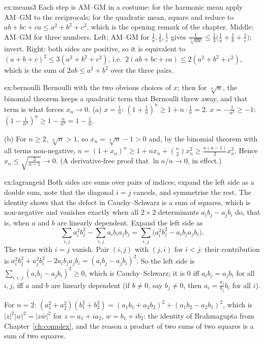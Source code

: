 \begin{solution}{ex:means3}
\idea Each step is AM--GM in a costume: for the harmonic mean apply AM--GM to the reciprocals; for the quadratic mean, square and reduce to $ab+bc+ca\le a^2+b^2+c^2$, which is the opening remark of the chapter.
\writeup Middle: AM--GM for three numbers. Left: AM--GM for $\frac1a,\frac1b,\frac1c$ gives $\frac1{\sqrt[3]{abc}}\le\frac13\bigl(\frac1a+\frac1b+\frac1c\bigr)$; invert. Right: both sides are positive, so it is equivalent to $(a+b+c)^2\le3(a^2+b^2+c^2)$, i.e.\ $2(ab+bc+ca)\le2(a^2+b^2+c^2)$, which is the sum of $2ab\le a^2+b^2$ over the three pairs.
\end{solution}

\begin{solution}{ex:bernoulli}
\idea Bernoulli with the two obvious choices of $x$; then for $\sqrt[n]n$, the binomial theorem keeps a quadratic term that Bernoulli threw away, and that term is what forces $x_n\to0$.
\writeup (a) $x=\frac1n$: $(1+\frac1n)^n\ge1+n\cdot\frac1n=2$. $x=-\frac1{n^2}\ge-1$: $(1-\frac1{n^2})^n\ge1-\frac n{n^2}=1-\frac1n$.

(b) For $n\ge2$, $\sqrt[n]n>1$, so $x_n=\sqrt[n]n-1>0$ and, by the binomial theorem with all terms non-negative, $n=(1+x_n)^n\ge1+nx_n+\binom n2x_n^2\ge\frac{n(n-1)}2x_n^2$. Hence $x_n\le\sqrt{\frac2{n-1}}\to0$. (A derivative-free proof that $\ln n/n\to0$, in effect.)
\end{solution}

\begin{solution}{ex:lagrangeid}
\idea Both sides are sums over pairs of indices; expand the left side as a double sum, note that the diagonal $i=j$ cancels, and symmetrise the rest. The identity shows that the defect in Cauchy--Schwarz is a sum of squares, which is non-negative and vanishes exactly when all $2\times2$ determinants $a_ib_j-a_jb_i$ do, that is, when $a$ and $b$ are linearly dependent.
\writeup Expand the left side as
\[
\sum_{i,j}a_i^2b_j^2-\sum_{i,j}a_ib_ia_jb_j
=\sum_{i,j}\bigl(a_i^2b_j^2-a_ib_ja_jb_i\bigr).
\] The terms with $i=j$ vanish. Pair $(i,j)$ with $(j,i)$ for $i<j$: their contribution is $a_i^2b_j^2+a_j^2b_i^2-2a_ib_ja_jb_i=(a_ib_j-a_jb_i)^2$. So the left side is $\sum_{i<j}(a_ib_j-a_jb_i)^2\ge0$, which is Cauchy--Schwarz; it is $0$ iff $a_ib_j=a_jb_i$ for all $i,j$, iff $a$ and $b$ are linearly dependent (if $b\ne0$, say $b_j\ne0$, then $a_i=\frac{a_j}{b_j}b_i$ for all $i$).

For $n=2$: $(a_1^2+a_2^2)(b_1^2+b_2^2)=(a_1b_1+a_2b_2)^2+(a_1b_2-a_2b_1)^2$, which is $|z|^2|w|^2=|z\bar w|^2$ for $z=a_1+ia_2$, $w=b_1+ib_2$: the identity of Brahmagupta from Chapter~\ref{ch:complex}, and the reason a product of two sums of two squares is a sum of two squares.
\end{solution}

